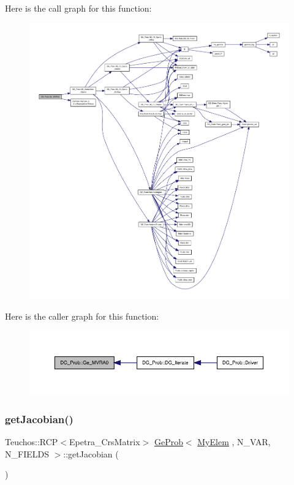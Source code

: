 Here is the call graph for this function\+:
\nopagebreak
\begin{figure}[H]
\begin{center}
\leavevmode
\includegraphics[width=350pt]{classDG__Prob_a4874e2992ccde1658a6ab46bc595779f_cgraph}
\end{center}
\end{figure}
Here is the caller graph for this function\+:
\nopagebreak
\begin{figure}[H]
\begin{center}
\leavevmode
\includegraphics[width=350pt]{classDG__Prob_a4874e2992ccde1658a6ab46bc595779f_icgraph}
\end{center}
\end{figure}
\mbox{\label{classGeProb_a5c8159fd807c26eaec5c0a9fa72636f6}} 
\subsubsection{\texorpdfstring{get\+Jacobian()}{getJacobian()}}
{\footnotesize\ttfamily Teuchos\+::\+R\+CP$<$Epetra\+\_\+\+Crs\+Matrix$>$ \hyperlink{classGeProb}{Ge\+Prob}$<$ \hyperlink{DG__Prob_8h_a83cd887ced9a6587428f267e50cd4787}{My\+Elem} , N\+\_\+\+V\+AR, N\+\_\+\+F\+I\+E\+L\+DS $>$\+::get\+Jacobian (\begin{DoxyParamCaption}{ }\end{DoxyParamCaption})\hspace{0.3cm}{\ttfamily [inherited]}}

